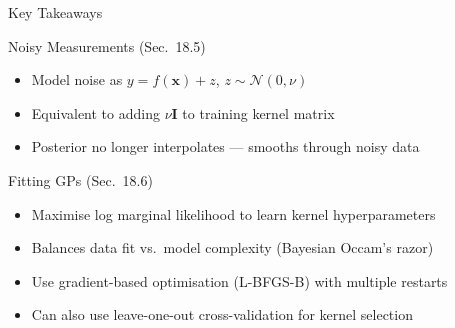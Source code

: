 \documentclass[aspectratio=169,10pt]{beamer}
\newcommand{\bx}{\mathbf{x}}
\newcommand{\Norm}{\mathcal{N}}
\begin{document}
\begin{frame}[allowframebreaks]{Key Takeaways}
  \begin{block}{Noisy Measurements (Sec.\ 18.5)}
    \begin{itemize}
      \item Model noise as $y = f(\bx) + z$, $z\sim\Norm(0,\nu)$
      \item Equivalent to adding $\nu\mathbf{I}$ to training kernel matrix
      \item Posterior no longer interpolates --- smooths through noisy data
    \end{itemize}
  \end{block}

  \begin{block}{Fitting GPs (Sec.\ 18.6)}
    \begin{itemize}
      \item Maximise log marginal likelihood to learn kernel hyperparameters
      \item Balances data fit vs.\ model complexity (Bayesian Occam's razor)
      \item Use gradient-based optimisation (L-BFGS-B) with multiple restarts
      \item Can also use leave-one-out cross-validation for kernel selection
    \end{itemize}
  \end{block}
\end{frame}
\end{document}
